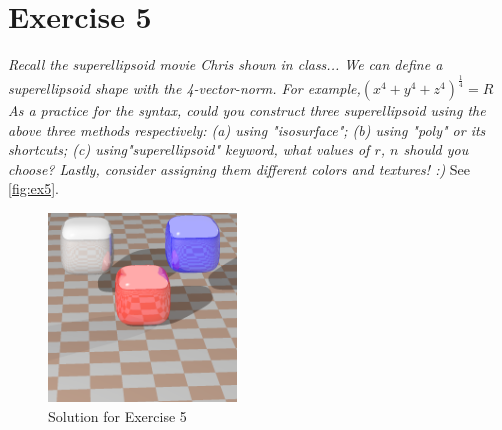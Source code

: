 \section{Exercise 5}
\textit{Recall the superellipsoid movie Chris shown in class... We can define a superellipsoid shape with the 4-vector-norm. For example,$(x^4+y^4+z^4)^\frac{1}{4}=R$ As a practice for the syntax, could you construct three superellipsoid using the above three methods respectively: (a) using "isosurface"; (b) using "poly" or its shortcuts; (c) using"superellipsoid" keyword, what values of $r$, $n$ should you choose? Lastly, consider assigning them different colors and textures! :)}
See \autoref{fig:ex5}.

\begin{figure}[h]
  \centering
  \includegraphics[height=5cm]{ex5.png}
  \caption{Solution for Exercise 5}
  \label{fig:ex5}
\end{figure}